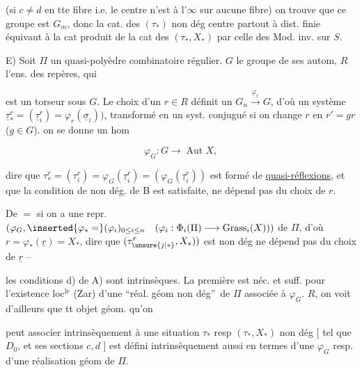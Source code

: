 (si $c\ne d$ en tte fibre i.e. le centre n'est à l'$\infty$ sur aucune fibre) on trouve que ce groupe est $G_m$, donc      la cat. des $(\tau_*)$ non dég  centre partout à dist. finie équivaut à la cat produit de la cat des $(\tau_*,X_*)$ par celle des Mod. inv. sur $S$.

E) Soit $\Pi$ un quasi-polyèdre combinatoire régulier. $G$ le groupe de ses autom, $R$ l'ens. des repères, qui


est un torseur sous $G$. Le choix d'un $r\in R$ définit un  $G_n\xrightarrow{\varphi_r}G$, d'où un système  $\underline\tau_*^r=(\underline\tau_i^r)=\varphi_r(\underline\sigma_i))$, transformé en un syst. conjugué  si on change $r$ en $r'=gr$ ($g\in G$).  on se donne un hom

\[
\varphi_G:G\longrightarrow\operatorname{Aut}X,
\]

dire que $\tau_*^r=(\tau_i^r)=\varphi_G(\underline\tau_i^r)=(\varphi_G(\underline\tau_i^r))$ est formé de \uline{quasi-réflexions}, et que la condition de non dég. de B est satisfaite, ne dépend pas du choix de $r$.

De $=$ si on a une repr.  $(\varphi_G,\inserted{\varphi_*=}(\varphi_i)_{0\leq i\leq n}\quad(\varphi_i:\Phi_i(\Pi)\longrightarrow\operatorname{Grass}_i(X)))$ de $\Pi$, d'où $r=\varphi_*(\underline r)=X_*$, dire que $(\tau_{\unsure{j|*}}^r,X_*))$  est non dég ne dépend pas du choix de $\underline r$ --  

les conditions  d) de A) sont intrinsèques. La première est  néc. et suff. pour l'existence loc$^{\mathrm{le}}$ (Zar) d'une \textquotedblleft réal. géom non dég\textquotedblright\ de $\Pi$ associée à $\varphi_G$.   $R$, on voit d'ailleurs que tt objet géom. qu'on

peut associer intrinsèquement à une situation $\tau_*$ resp $(\tau_*,X_*)$ non dég [ tel que $D_0$, et ses sections $c,d$ ] est défini intrinsèquement aussi en termes d'une  $\varphi_G$  resp. d'une \deleted{\unsure{$\varphi$}} réalisation géom  de $\Pi$.

